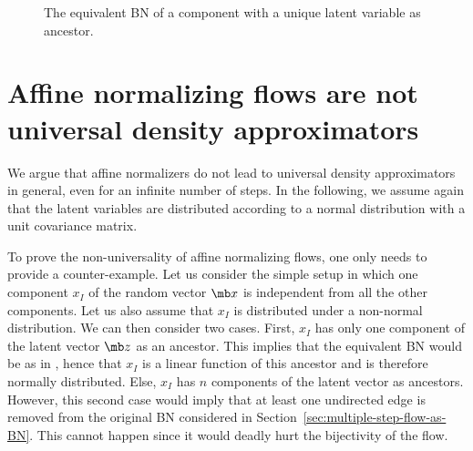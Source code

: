 \begin{figure}
    \centering
    \hspace{-1.5em}

    \caption{The equivalent BN of a component with a unique latent variable as ancestor.}
    \label{fig:BN-x-I}
    \vspace{-2.2em}
\end{figure}

\section{Affine normalizing flows are not universal density approximators}

We argue that affine normalizers do not lead to universal density approximators in general, even for an infinite number of steps. In the following, we assume again that the latent variables are distributed according to a normal distribution with a unit covariance matrix.


To prove the non-universality of affine normalizing flows, one only needs to provide a counter-example.
Let us consider the simple setup in which one component $x_I$ of the random vector $\mb x$ is independent from all the other components.
Let us also assume that $x_I$ is distributed under a non-normal distribution.
We can then consider two cases.
First, $x_I$ has only one component of the latent vector $\mb z$ as an ancestor. This implies that the equivalent BN would be as in , hence that $x_I$ is a linear function of this ancestor and is therefore normally distributed.
Else, $x_I$ has $n$ components of the latent vector as ancestors.
However, this second case would imply that at least one undirected edge is removed from the original BN considered in Section~\ref{sec:multiple-step-flow-as-BN}.
This cannot happen since it would deadly hurt the bijectivity of the flow.


